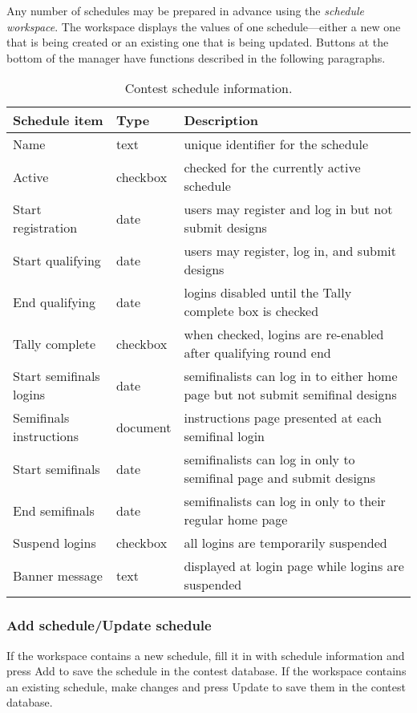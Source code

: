 \documentclass[11pt,letterpaper]{refart}
\newenvironment{fulltable}[1][tbp]
 {\begin{table}[#1]%
  \hspace*{-\leftmarginwidth}%
  \begin{minipage}{\fullwidth}}
 {\end{minipage}\end{table}}
\def\ui#1{\textsf{#1}}
\begin{document}
Any number of schedules
may be prepared in advance using the \emph{schedule workspace}.
The workspace displays the values of one schedule---either a new
one that is being created or an existing one that is being updated.
Buttons at the bottom of the manager have functions described in the
following paragraphs.
\begin{fulltable}
\centering
\caption{Contest schedule information.}
\begin{tabular}{>{\sffamily}llp{9cm}}
\bfseries Schedule item & \bfseries Type & \bfseries Description \\ \hline 
Name & text & unique identifier for the schedule \\
Active & checkbox & checked for the currently active schedule \\
Start registration & date & users may register and log in but not submit designs \\
Start qualifying & date & users may register, log in, and submit designs \\
End qualifying & date & logins disabled until the \ui{Tally complete} box is checked \\
Tally complete & checkbox & when checked, logins are re-enabled after qualifying round end \\
Start semifinals logins & date & semifinalists can log in to either home page but not submit semifinal designs\\
Semifinals instructions & document & instructions page presented at each semifinal login\\
Start semifinals & date & semifinalists can log in only to semifinal page and submit designs \\
End semifinals & date & semifinalists can log in only to their regular home page \\
Suspend logins & checkbox & all logins are temporarily suspended \\
Banner message & text & displayed at login page while logins are suspended
\end{tabular}
\label{tbl:schedule}
\end{fulltable}

\subsubsection{Add schedule/Update schedule}
If the workspace contains a new schedule, fill it in with schedule information
and press \ui{Add} to save the schedule in the contest database.  If the
workspace contains an existing schedule, make changes and press \ui{Update}
to save them in the contest database.
\end{document}
